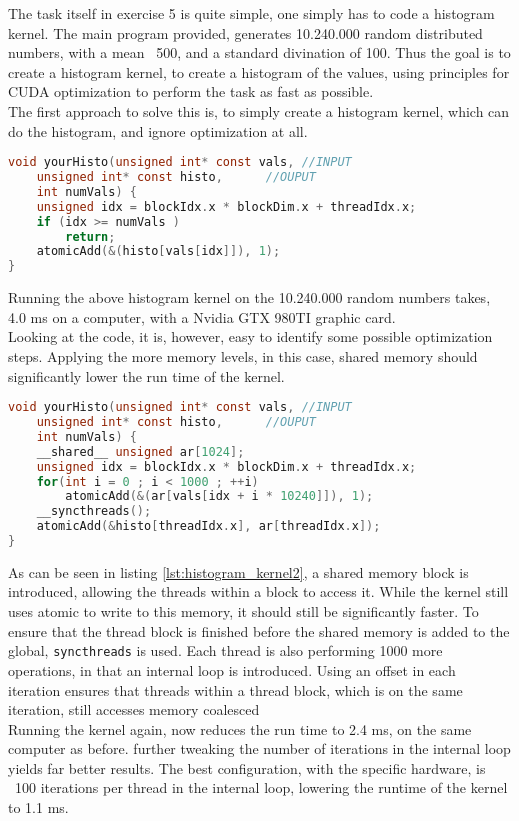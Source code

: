 The task itself in exercise 5 is quite simple, one simply has to code a histogram kernel. The main program provided, generates 10.240.000 random distributed numbers, with a mean ~500, and a standard divination of 100. Thus the goal is to create a histogram kernel, to create a histogram of the values, using principles for CUDA optimization to perform the task as fast as possible.\\

The first approach to solve this is, to simply create a histogram kernel, which can do the histogram, and ignore optimization at all.

\begin{lstlisting}[language=C,caption={Histogram kernel},label=lst:histogram_kernel]
void yourHisto(unsigned int* const vals, //INPUT
	unsigned int* const histo,      //OUPUT
	int numVals) {
	unsigned idx = blockIdx.x * blockDim.x + threadIdx.x;
	if (idx >= numVals )
		return;
	atomicAdd(&(histo[vals[idx]]), 1);
}
\end{lstlisting}

Running the above histogram kernel on the 10.240.000 random numbers takes, 4.0 ms on a computer, with a Nvidia GTX 980TI graphic card.\\ 
Looking at the code, it is, however, easy to identify some possible optimization steps. Applying the more memory levels, in this case, shared memory should significantly lower the run time of the kernel.\\
 
 \begin{lstlisting}[language=C,caption={Introducing shared memory into the histogram kernel},label=lst:histogram_kernel2]
void yourHisto(unsigned int* const vals, //INPUT
	unsigned int* const histo,      //OUPUT
	int numVals) {
	__shared__ unsigned ar[1024];
	unsigned idx = blockIdx.x * blockDim.x + threadIdx.x;
	for(int i = 0 ; i < 1000 ; ++i)
		atomicAdd(&(ar[vals[idx + i * 10240]]), 1);
	__syncthreads();
	atomicAdd(&histo[threadIdx.x], ar[threadIdx.x]);
}
 \end{lstlisting}
 
 As can be seen in listing \ref{lst:histogram_kernel2}, a shared memory block is introduced, allowing the threads within a block to access it. While the kernel still uses atomic to write to this memory, it should still be significantly faster. To ensure that the thread block is finished before the shared memory is added to the global, \texttt{syncthreads} is used. Each thread is also performing 1000 more operations, in that an internal loop is introduced. Using an offset in each iteration ensures that threads within a thread block, which is on the same iteration, still accesses memory coalesced\\
Running the kernel again, now reduces the run time to 2.4 ms, on the same computer as before. further tweaking the number of iterations in the internal loop yields far better results. The best configuration, with the specific hardware, is ~100 iterations per thread in the internal loop, lowering the runtime of the kernel to 1.1 ms.\\